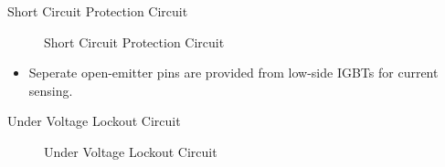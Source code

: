 \begin{frame}{Short Circuit Protection Circuit}
	\begin{figure}
		\centering


		\caption{Short Circuit Protection Circuit}
	\end{figure}


	\begin{itemize}
		\item Seperate open-emitter pins are provided from low-side IGBTs for current sensing.
	\end{itemize}
\end{frame}




\begin{frame}{Under Voltage Lockout Circuit}
	\begin{figure}
		\centering


		\caption{Under Voltage Lockout Circuit}
	\end{figure}
\end{frame}


